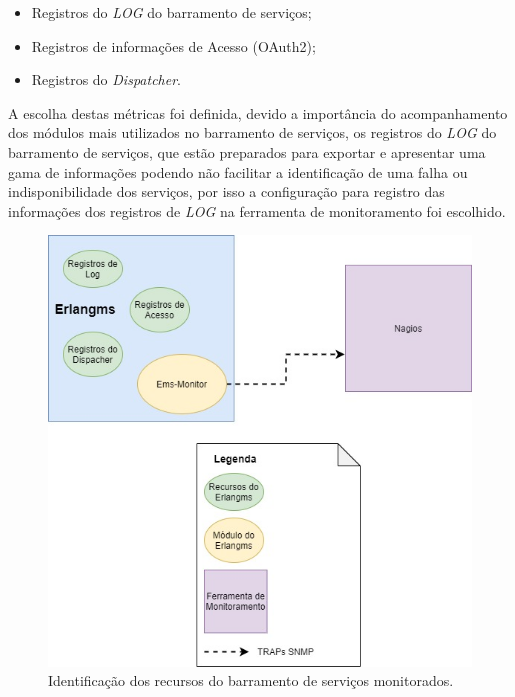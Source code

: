 \begin{itemize}
    \item Registros do \textit{LOG} do barramento de serviços;
    \item Registros de informações de Acesso (OAuth2);
    \item Registros do \textit{Dispatcher}.
\end{itemize}

A escolha destas métricas foi definida, devido a importância do acompanhamento dos módulos mais utilizados no barramento de serviços, os registros do \textit{LOG} do barramento de serviços, que estão preparados para exportar e apresentar uma gama de informações podendo não facilitar a identificação de uma falha ou indisponibilidade dos serviços, por isso a configuração para registro das informações dos registros de \textit{LOG} na ferramenta de monitoramento foi escolhido. 

\begin{figure}[H]
	\begin{center}
	\includegraphics[scale = 0.60]{img/Monitoramento_Recusos_Barramento.jpg}
	\caption{Identificação dos recursos do barramento de serviços monitorados.}
	\label{fun:fig:ResourcesEMS-monitoring}
	\end{center}
\end{figure}



